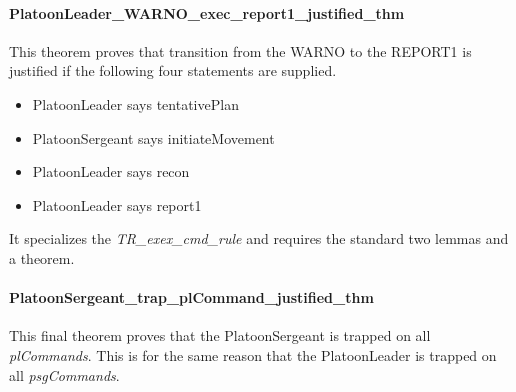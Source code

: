 \documentclass[../../main/main.tex]{subfiles}
\begin{document}
\HOLssmPlanPBTheoremsPlatoonLeaderXXtrapXXpsgCommandXXlemma

\HOLssmPlanPBTheoremsPlatoonLeaderXXtrapXXpsgCommandXXjustifiedXXlemma

\HOLssmPlanPBTheoremsPlatoonSergeantXXtrapXXplCommandXXjustifiedXXthm


\paragraph*{PlatoonLeader_WARNO_exec_report1_justified_thm}
This theorem proves that transition from the WARNO to the REPORT1 is justified if the following four statements are supplied.
\begin{itemize}
\item PlatoonLeader says tentativePlan
\item PlatoonSergeant says initiateMovement
\item PlatoonLeader says recon
\item PlatoonLeader says report1
\end{itemize}

It specializes the \textit{TR_exex_cmd_rule} and requires the standard two lemmas and a theorem. 

\HOLssmPlanPBTheoremsPlatoonLeaderXXWARNOXXexecXXreportOneXXlemma

\HOLssmPlanPBTheoremsPlatoonLeaderXXWARNOXXexecXXreportOneXXjustifiedXXlemma

\HOLssmPlanPBTheoremsPlatoonLeaderXXWARNOXXexecXXreportOneXXjustifiedXXthm


\paragraph*{PlatoonSergeant_trap_plCommand_justified_thm}
This final theorem proves that the PlatoonSergeant is trapped on all \textit{plCommands}.  This is for the same reason that the PlatoonLeader is trapped on all \textit{psgCommands}.

\HOLssmPlanPBTheoremsPlatoonSergeantXXtrapXXplCommandXXlemma
\end{document}
